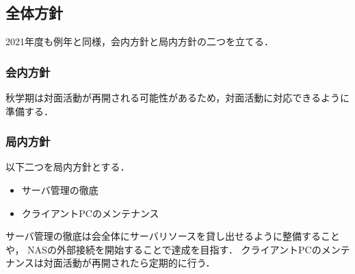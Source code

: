 \subsection*{全体方針}


2021年度も例年と同様，会内方針と局内方針の二つを立てる．

\subsubsection*{会内方針}
秋学期は対面活動が再開される可能性があるため，対面活動に対応できるように準備する．

\subsubsection*{局内方針}
以下二つを局内方針とする．
\begin{itemize}
  \item サーバ管理の徹底
  \item クライアントPCのメンテナンス
\end{itemize}
サーバ管理の徹底は会全体にサーバリソースを貸し出せるように整備することや，
NASの外部接続を開始することで達成を目指す．
クライアントPCのメンテナンスは対面活動が再開されたら定期的に行う．
